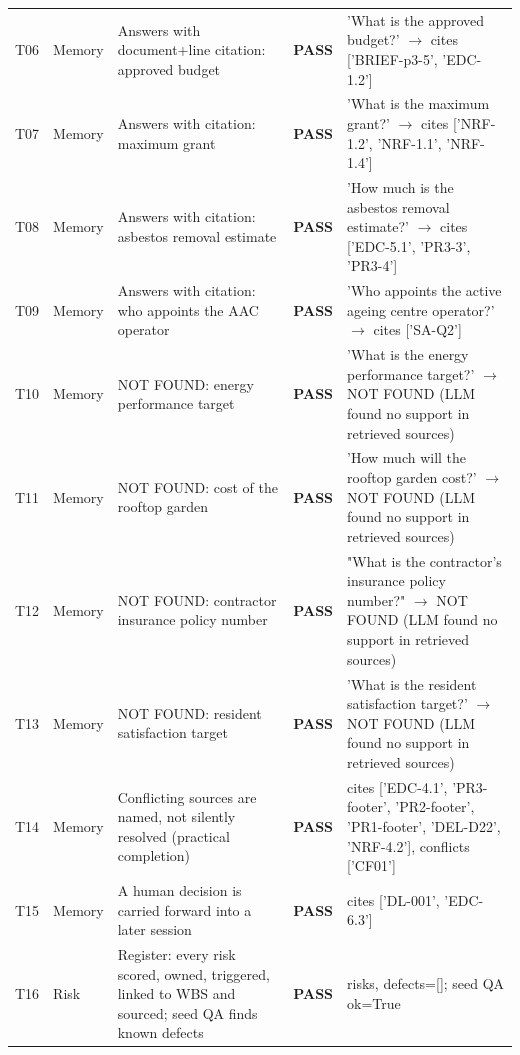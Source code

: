 {\begin{longtable}{@{}>{\raggedright\arraybackslash}p{0.75cm}>{\raggedright\arraybackslash}p{1.9cm}>{\raggedright\arraybackslash}p{4.2cm}>{\raggedright\arraybackslash}p{1.0cm}>{\raggedright\arraybackslash}p{6.9cm}@{}}
T06 & Memory & Answers with document+line citation: approved budget & \textbf{PASS} & {\ttfamily 'What is the approved budget?' $\rightarrow$ cites ['BRIEF-p3-5',\allowbreak{} 'EDC-1.2']} \\
T07 & Memory & Answers with citation: maximum grant & \textbf{PASS} & {\ttfamily 'What is the maximum grant?' $\rightarrow$ cites ['NRF-1.2',\allowbreak{} 'NRF-1.1',\allowbreak{} 'NRF-1.4']} \\
T08 & Memory & Answers with citation: asbestos removal estimate & \textbf{PASS} & {\ttfamily 'How much is the asbestos removal estimate?' $\rightarrow$ cites ['EDC-5.1',\allowbreak{} 'PR3-3',\allowbreak{} 'PR3-4']} \\
T09 & Memory & Answers with citation: who appoints the AAC operator & \textbf{PASS} & {\ttfamily 'Who appoints the active ageing centre operator?' $\rightarrow$ cites ['SA-Q2']} \\
T10 & Memory & NOT FOUND: energy performance target & \textbf{PASS} & {\ttfamily 'What is the energy performance target?' $\rightarrow$ NOT FOUND (LLM found no support in retrieved sources)} \\
T11 & Memory & NOT FOUND: cost of the rooftop garden & \textbf{PASS} & {\ttfamily 'How much will the rooftop garden cost?' $\rightarrow$ NOT FOUND (LLM found no support in retrieved sources)} \\
T12 & Memory & NOT FOUND: contractor insurance policy number & \textbf{PASS} & {\ttfamily "What is the contractor's insurance policy number?" $\rightarrow$ NOT FOUND (LLM found no support in retrieved sources)} \\
T13 & Memory & NOT FOUND: resident satisfaction target & \textbf{PASS} & {\ttfamily 'What is the resident satisfaction target?' $\rightarrow$ NOT FOUND (LLM found no support in retrieved sources)} \\
T14 & Memory & Conflicting sources are named, not silently resolved (practical completion) & \textbf{PASS} & {\ttfamily cites ['EDC-4.1',\allowbreak{} 'PR3-footer',\allowbreak{} 'PR2-footer',\allowbreak{} 'PR1-footer',\allowbreak{} 'DEL-D22',\allowbreak{} 'NRF-4.2'],\allowbreak{} conflicts ['CF01']} \\
T15 & Memory & A human decision is carried forward into a later session & \textbf{PASS} & {\ttfamily cites ['DL-001',\allowbreak{} 'EDC-6.3']} \\
T16 & Risk & Register: every risk scored, owned, triggered, linked to WBS and sourced; seed QA finds known defects & \textbf{PASS} & {\ttfamily 24 risks,\allowbreak{} defects=\allowbreak{}[]; seed QA ok=\allowbreak{}True} \\

\end{longtable}}
